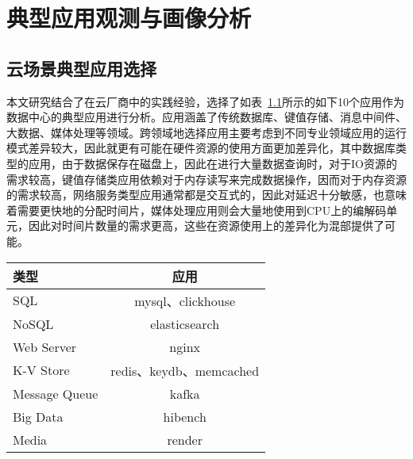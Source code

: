 \chapter{典型应用观测与画像分析}\label{chap:profiling}




\section{云场景典型应用选择}


本文研究结合了在云厂商中的实践经验，选择了如表~\ref{tab:typical_application}所示的如下10个应用作为数据中心的典型应用进行分析。应用涵盖了传统数据库、键值存储、消息中间件、大数据、媒体处理等领域。跨领域地选择应用主要考虑到不同专业领域应用的运行模式差异较大，因此就更有可能在硬件资源的使用方面更加差异化，其中数据库类型的应用，由于数据保存在磁盘上，因此在进行大量数据查询时，对于IO资源的需求较高，键值存储类应用依赖对于内存读写来完成数据操作，因而对于内存资源的需求较高，网络服务类型应用通常都是交互式的，因此对延迟十分敏感，也意味着需要更快地的分配时间片，媒体处理应用则会大量地使用到CPU上的编解码单元，因此对时间片数量的需求更高，这些在资源使用上的差异化为混部提供了可能。

\begin{table}
    \label{tab:typical_application}
    \footnotesize%
    \setlength{\tabcolsep}{4pt}%
    \renewcommand{\arraystretch}{1.5}%
    \centering
    \begin{tabular}{lc}
        \hline
        类型 & 应用\\
        \hline
        SQL & mysql、clickhouse\\
        NoSQL & elasticsearch\\
        Web Server & nginx\\
        K-V Store & redis、keydb、memcached\\
        Message Queue & kafka\\
        Big Data & hibench\\
        Media & render\\
        \hline
    \end{tabular}
\end{table}

